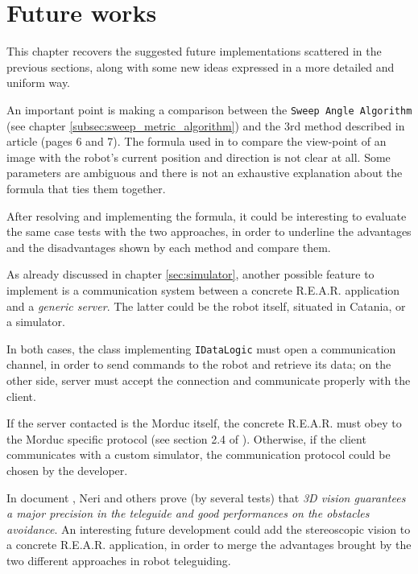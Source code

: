 \section{Future works}
\label{sec:future_works}

This chapter recovers the suggested future implementations scattered in the
previous sections, along with some new ideas expressed in a more detailed and
uniform way.
%

%
An important point is making a comparison between the \texttt{Sweep Angle
Algorithm} (see chapter \ref{subsec:sweep_metric_algorithm}) and the 3rd method
described in article \cite{sugimoto} (pages 6 and 7).
The formula used in \cite{sugimoto} to compare the view-point of an image with
the robot's current position and direction is not clear at all. Some parameters
are ambiguous and there is not an exhaustive explanation about the formula that
ties them together.
%

%
After resolving and implementing the formula, it could be interesting to evaluate
the same case tests with the two approaches, in order to underline the advantages
and the disadvantages shown by each method and compare them.
%

%
As already discussed in chapter \ref{sec:simulator}, another possible feature to
implement is a communication system between a concrete \textsf{R.E.A.R.}
application and a \textit{generic server}. The latter could be the robot itself,
situated in Catania, or a simulator.
%

%
In both cases, the class implementing \texttt{IDataLogic} must open a communication
channel, in order to send commands to the robot and retrieve its data; on the other
side, server must accept the connection and communicate properly with the client.
%

%
If the server contacted is the Morduc itself, the concrete \textsf{R.E.A.R.} must obey
to the Morduc specific protocol (see section 2.4 of \cite{morduc:dasero}). Otherwise,
if the client communicates with a custom simulator, the communication protocol could be
chosen by the developer.
%

%
In document \cite{morduc:neri}, Neri and others prove (by several tests) that \textit{3D
vision guarantees a major precision in the teleguide and good performances on the obstacles
avoidance}. An interesting future development could add the stereoscopic vision to a concrete
\textsf{R.E.A.R.} application, in order to merge the advantages brought by the two different
approaches in robot teleguiding.
%

